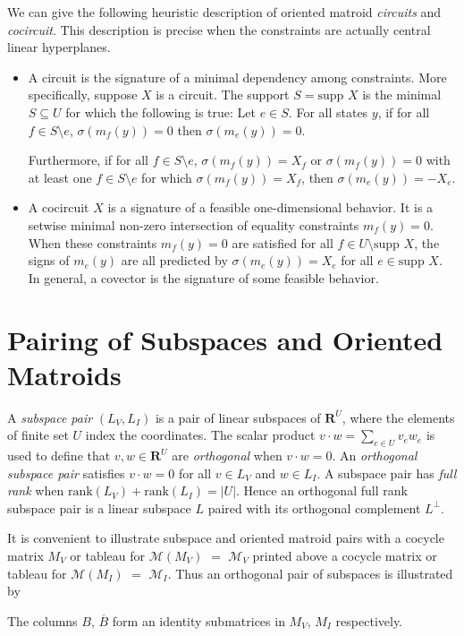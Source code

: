 \documentclass{amsproc-sunycstr}
\def\Reals{\ensuremath{\mathbf R}}
\theoremstyle{plain}
\theoremstyle{definition}
\theoremstyle{remark}
\newcommand{\supp}[1]{{{\mbox{supp\ }#1}}}
\begin{document}
We can give the following heuristic description of oriented matroid 
\textit{circuits} and \textit{cocircuit}.  This description is precise
when the constraints are actually central linear hyperplanes.
\begin{itemize}
\item A circuit is the signature of a minimal dependency among constraints.
More specifically, suppose $X$ is a circuit.  The support $S=\supp{X}$ 
is the minimal $S\subseteq U$ for which the following is true:  Let $e\in S$.
For all states $y$, if for all $f\in S\setminus e$, $\sigma(m_f(y))=0$
then $\sigma(m_e(y))=0$.  

Furthermore, if for all $f\in S\setminus e$, 
$\sigma(m_f(y))=X_f$ or $\sigma(m_f(y))=0$ with at least 
one $f\in S\setminus e$ for which $\sigma(m_f(y))=X_f$, 
then $\sigma(m_e(y))=-X_e$.

\item A cocircuit $X$ is a signature of a feasible one-dimensional behavior.
It is a setwise minimal non-zero intersection of equality constraints
$m_f(y)=0$.  When these constraints $m_f(y)=0$ are satisfied for all
$f\in U\setminus\supp{X}$, the signs of $m_e(y)$ are all predicted by
$\sigma(m_e(y))=X_e$ for all $e\in\supp{X}$.  In general,
a covector is the signature of some feasible behavior.
\end{itemize}








\section{Pairing of Subspaces and Oriented Matroids}

A \textit{subspace pair} $(L_V, L_I)$ is a pair of linear subspaces of
$\Reals^U$, where the elements of finite set $U$ index the coordinates.
The scalar product $v\cdot w = \sum_{e\in U}v_e w_e$ is used to define that
$v, w \in \Reals^U$ are \textit{orthogonal} when $v\cdot w = 0$.  An 
\textit{orthogonal subspace pair}  satisfies $v\cdot w = 0$ for
all $v\in L_V$ and $w\in L_I$.  A subspace pair has \textit{full rank} when
$\mathrm{rank}(L_V)+\mathrm{rank}(L_I)= |U|$.  Hence an orthogonal full rank 
subspace pair is a linear subspace $L$ paired with its orthogonal complement
$L^\perp$.


It is convenient to illustrate subspace and oriented matroid pairs
with a cocycle matrix $M_V$ or tableau for 
$\mathcal{M}(M_V)$ $=$ $\mathcal{M}_V$ printed above
a  cocycle matrix or tableau for
$\mathcal{M}(M_I)$ $=$ $\mathcal{M}_I$.  Thus an orthogonal pair of 
subspaces is illustrated by
\begin{center}

\end{center}
The columns $B$, $\overline{B}$ form an identity submatrices in $M_V$,
$M_I$ respectively.
\end{document}
